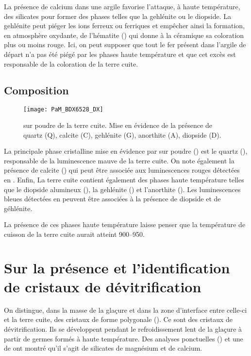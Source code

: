 La présence de calcium dans une argile favorise l'attaque, à haute 
température, des silicates pour former des phases telles que la 
gehlénite ou le diopside. La gehlénite peut piéger les ions ferreux 
ou ferriques et empêcher ainsi la formation, en atmosphère oxydante, 
de l'hématite () qui donne à la céramique sa coloration 
plus ou moins rouge. Ici, on peut supposer que tout le fer présent 
dans l'argile de départ n'a pas été piégé par les phases haute 
température et que cet excès est responsable de la coloration de 
la terre cuite.

\subsection{Composition \cristallo}
\begin{figure}[htb]
  \texttt{[image: PaM\_BDX6528\_DX]}
  \caption[\ -- \DX sur poudre de la terre cuite]
          {\legendeA 
           \DX sur poudre de la terre cuite. Mise en évidence de la présence de quartz (Q), calcite (C), gehlénite (G), anorthite (A), diopside (D).}
  \label{DRX:6528}
\end{figure}

La principale phase cristalline mise en évidence par \DX sur 
poudre () est le quartz (\quartz), responsable de la 
luminescence mauve de la terre cuite. On note également la présence de 
calcite (\calcite) qui peut être associée aux luminescences rouges 
détectées en \CL. Enfin, La terre cuite contient également des phases 
haute température telles que le diopside alumineux (\diopsidealfe), la 
gehlénite (\gehlenite) et l'anorthite (\anorthite). Les luminescences 
bleues détectées en \CL peuvent être associées à la présence de 
diopside et de géhlénite.

La présence de ces phases haute température laisse penser 
que la température de cuisson de la terre cuite aurait atteint 
\SIrange[range-phrase=\ à\ ]{900}{950}{\degC}.


\section{Sur la présence et l'identification de cristaux de 
         dévitrification}

On distingue, dans la masse de la glaçure et dans la zone d'interface entre celle-ci et la terre cuite, des cristaux de forme polygonale (). Ce sont des cristaux de dévitrification. Ils se développent pendant le refroidissement lent de la glaçure à partir de germes formés à haute température. Des analyses ponctuelles () et une \carto de \RX ont montré qu'il s'agit de silicates de magnésium et de calcium.

